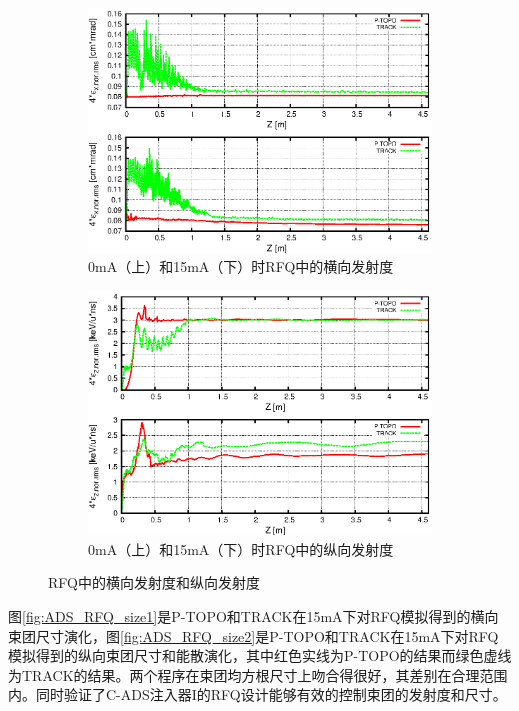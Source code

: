 \begin{figure}[!htb]
    \centering
    \begin{subfigure}[b]{0.9\textwidth}
        \includegraphics[width=\textwidth]{Img/ADS_RFQ_emit1.eps}
        \caption{0mA（上）和15mA（下）时RFQ中的横向发射度}
    \end{subfigure}
    \begin{subfigure}[b]{0.9\textwidth}
        \includegraphics[width=\textwidth]{Img/ADS_RFQ_emit2.eps}
        \caption{0mA（上）和15mA（下）时RFQ中的纵向发射度}
    \end{subfigure}
    \caption{RFQ中的横向发射度和纵向发射度}\label{fig:ADS_RFQ_emit}
\end{figure}



图\ref{fig:ADS_RFQ_size1}是P-TOPO和TRACK在15mA下对RFQ模拟得到的横向束团尺寸演化，图\ref{fig:ADS_RFQ_size2}是P-TOPO和TRACK在15mA下对RFQ模拟得到的纵向束团尺寸和能散演化，其中红色实线为P-TOPO的结果而绿色虚线为TRACK的结果。两个程序在束团均方根尺寸上吻合得很好，其差别在合理范围内。同时验证了C-ADS注入器I的RFQ设计能够有效的控制束团的发射度和尺寸。

